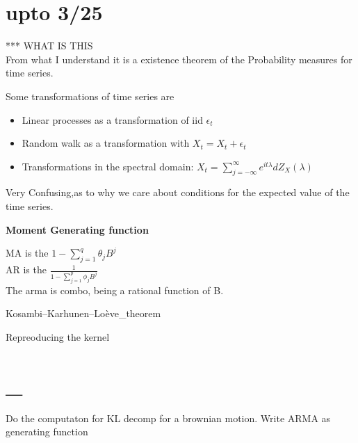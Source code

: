 \documentclass[answers,12pt,addpoints]{exam}
\begin{document}
\section{upto 3/25}

\begin{theorem}
    *** WHAT IS THIS\\
    From what I understand it is a existence theorem of the Probability measures for time series.\\
\end{theorem}
\begin{definition}
    Some transformations of time series are
   \begin{itemize}
    \item Linear processes as a transformation of iid $\epsilon_t$
    \item Random walk as a transformation with $X_t = X_t + \epsilon_t$
    \item Transformations in the spectral domain: $X_t = \sum_{j=-\infty}^{\infty} e^{it\lambda} dZ_X(\lambda)$
   \end{itemize}
\end{definition}
\begin{definition}[Section 3.3]
    Very Confusing,as to why we care about conditions for the expected value of the time series.\\
\end{definition}

\textbf{Moment Generating function}
\begin{definition}
    MA is the $1 - \sum_{j=1}^{q} \theta_j B^j$\\
    AR is the $\frac{1}{1 - \sum_{j=1}^{p} \phi_j B^j}$\\
    The arma is combo, being a rational function of B.\\
\end{definition}
\begin{definition}
    
\end{definition}


Kosambi–Karhunen–Loève_theorem

Repreoducing the kernel 


\section{_}
Do the computaton for KL decomp for a brownian motion. 
Write ARMA as generating function
\end{document}
